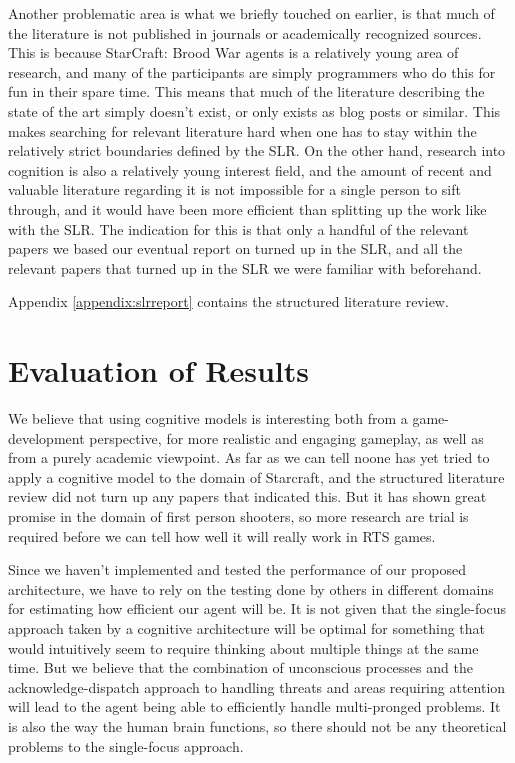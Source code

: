 Another problematic area is what we briefly touched on earlier, is that much of
the literature is not published in journals or academically recognized sources.
This is because StarCraft: Brood War agents is a relatively young area of
research, and many of the participants are simply programmers who do this for
fun in their spare time. This means that much of the literature describing the
state of the art simply doesn't exist, or only exists as blog posts or similar.
This makes searching for relevant literature hard when one has to stay within
the relatively strict boundaries defined by the SLR. On the other hand,
research into cognition is also a relatively young interest field, and the
amount of recent and valuable literature regarding it is not impossible for a
single person to sift through, and it would have been more efficient than
splitting up the work like with the SLR. The indication for this is that only a
handful of the relevant papers we based our eventual report on turned up in the
SLR, and all the relevant papers that turned up in the SLR we were familiar
with beforehand.

Appendix \ref{appendix:slrreport} contains the structured literature review.

\section{Evaluation of Results}
We believe that using cognitive models is interesting both from a
game-development perspective, for more realistic and engaging gameplay, as well
as from a purely academic viewpoint. As far as we can tell noone has yet tried to apply a cognitive model to the domain of Starcraft, and the structured literature review did not turn up any papers that indicated this. But it has shown great promise in the domain of first person shooters, so more research are trial is required before we can tell how well it will really work in RTS games. 

Since we haven't implemented and tested the performance of our proposed
architecture, we have to rely on the testing done by others in different
domains for estimating how efficient our agent will be. It is not given that the
single-focus approach taken by a cognitive architecture will be optimal for
something that would intuitively seem to require thinking about multiple things
at the same time. But we believe that the combination of unconscious processes
and the acknowledge-dispatch approach to handling threats and areas requiring
attention will lead to the agent being able to efficiently handle multi-pronged
problems. It is also the way the human brain functions, so there should not be any theoretical problems to the single-focus approach. 

